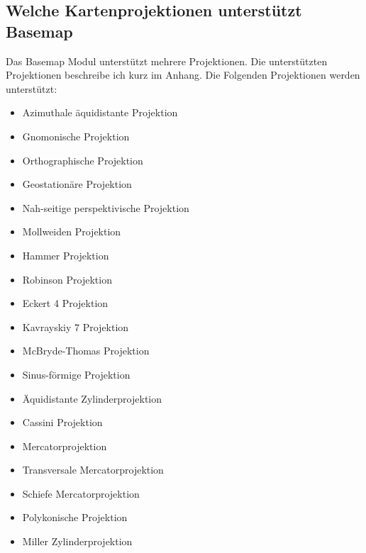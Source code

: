 \subsection{Welche Kartenprojektionen unterstützt Basemap}
Das \textsf{Basemap} Modul unterstützt mehrere Projektionen. Die unterstützten Projektionen beschreibe ich kurz im Anhang. Die Folgenden Projektionen werden unterstützt:\\
\begin{itemize}
\item Azimuthale äquidistante Projektion\\
\item Gnomonische Projektion\\
\item Orthographische Projektion\\
\item Geostationäre Projektion\\
\item Nah-seitige perspektivische Projektion \\
\item Mollweiden Projektion\\
\item Hammer Projektion\\
\item Robinson Projektion \\
\item Eckert 4 Projektion\\
\item Kavrayskiy 7 Projektion\\
\item McBryde-Thomas Projektion \\
\item Sinus-förmige Projektion\\
\item Äquidistante Zylinderprojektion\\
\item Cassini Projektion \\
\item Mercatorprojektion\\
\item Transversale Mercatorprojektion \\
\item Schiefe Mercatorprojektion\\
\item Polykonische Projektion\\
\item Miller Zylinderprojektion\\

\end{itemize}
